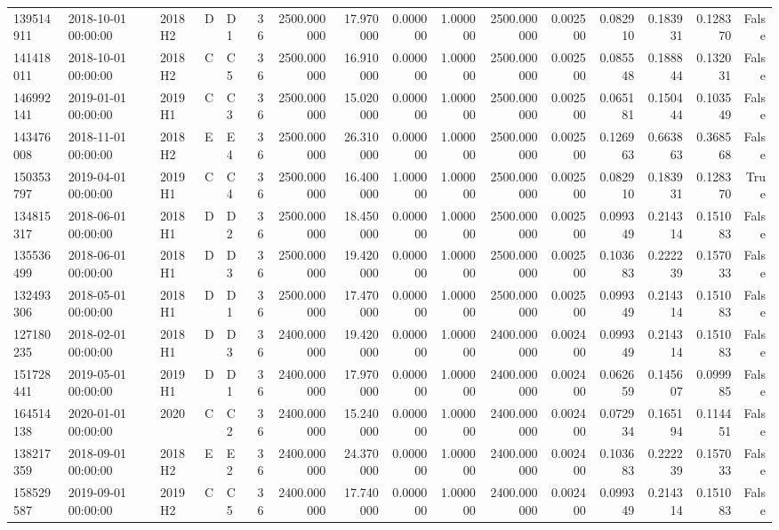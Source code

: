 \begin{tabular}{lllllrrrrrrrrrrr}
139514911 & 2018-10-01 00:00:00 & 2018H2 & D & D1 & 36 & 2500.000000 & 17.970000 & 0.000000 & 1.000000 & 2500.000000 & 0.002500 & 0.082910 & 0.183931 & 0.128370 & False \\
141418011 & 2018-10-01 00:00:00 & 2018H2 & C & C5 & 36 & 2500.000000 & 16.910000 & 0.000000 & 1.000000 & 2500.000000 & 0.002500 & 0.085548 & 0.188844 & 0.132031 & False \\
146992141 & 2019-01-01 00:00:00 & 2019H1 & C & C3 & 36 & 2500.000000 & 15.020000 & 0.000000 & 1.000000 & 2500.000000 & 0.002500 & 0.065181 & 0.150444 & 0.103549 & False \\
143476008 & 2018-11-01 00:00:00 & 2018H2 & E & E4 & 36 & 2500.000000 & 26.310000 & 0.000000 & 1.000000 & 2500.000000 & 0.002500 & 0.126963 & 0.663863 & 0.368568 & False \\
150353797 & 2019-04-01 00:00:00 & 2019H1 & C & C4 & 36 & 2500.000000 & 16.400000 & 1.000000 & 1.000000 & 2500.000000 & 0.002500 & 0.082910 & 0.183931 & 0.128370 & True \\
134815317 & 2018-06-01 00:00:00 & 2018H1 & D & D2 & 36 & 2500.000000 & 18.450000 & 0.000000 & 1.000000 & 2500.000000 & 0.002500 & 0.099349 & 0.214314 & 0.151083 & False \\
135536499 & 2018-06-01 00:00:00 & 2018H1 & D & D3 & 36 & 2500.000000 & 19.420000 & 0.000000 & 1.000000 & 2500.000000 & 0.002500 & 0.103683 & 0.222239 & 0.157033 & False \\
132493306 & 2018-05-01 00:00:00 & 2018H1 & D & D1 & 36 & 2500.000000 & 17.470000 & 0.000000 & 1.000000 & 2500.000000 & 0.002500 & 0.099349 & 0.214314 & 0.151083 & False \\
127180235 & 2018-02-01 00:00:00 & 2018H1 & D & D3 & 36 & 2400.000000 & 19.420000 & 0.000000 & 1.000000 & 2400.000000 & 0.002400 & 0.099349 & 0.214314 & 0.151083 & False \\
151728441 & 2019-05-01 00:00:00 & 2019H1 & D & D1 & 36 & 2400.000000 & 17.970000 & 0.000000 & 1.000000 & 2400.000000 & 0.002400 & 0.062659 & 0.145607 & 0.099985 & False \\
164514138 & 2020-01-01 00:00:00 & 2020 & C & C2 & 36 & 2400.000000 & 15.240000 & 0.000000 & 1.000000 & 2400.000000 & 0.002400 & 0.072934 & 0.165194 & 0.114451 & False \\
138217359 & 2018-09-01 00:00:00 & 2018H2 & E & E2 & 36 & 2400.000000 & 24.370000 & 0.000000 & 1.000000 & 2400.000000 & 0.002400 & 0.103683 & 0.222239 & 0.157033 & False \\
158529587 & 2019-09-01 00:00:00 & 2019H2 & C & C5 & 36 & 2400.000000 & 17.740000 & 0.000000 & 1.000000 & 2400.000000 & 0.002400 & 0.099349 & 0.214314 & 0.151083 & False \\

\end{tabular}
